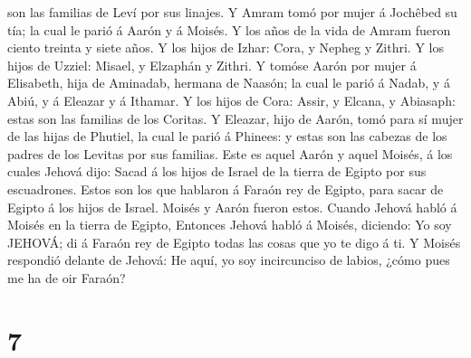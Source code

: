 son las familias de Leví por sus linajes.  Y Amram tomó
por mujer á Jochêbed su tía; la cual le parió á Aarón y á Moisés. Y los
años de la vida de Amram fueron ciento treinta y siete años.
 Y los hijos de Izhar: Cora, y Nepheg y Zithri.
 Y los hijos de Uzziel: Misael, y Elzaphán y Zithri.
 Y tomóse Aarón por mujer á Elisabeth, hija de Aminadab,
hermana de Naasón; la cual le parió á Nadab, y á Abiú, y á Eleazar y á
Ithamar.  Y los hijos de Cora: Assir, y Elcana, y
Abiasaph: estas son las familias de los Coritas.  Y
Eleazar, hijo de Aarón, tomó para sí mujer de las hijas de Phutiel, la
cual le parió á Phinees: y estas son las cabezas de los padres de los
Levitas por sus familias.  Este es aquel Aarón y aquel
Moisés, á los cuales Jehová dijo: Sacad á los hijos de Israel de la
tierra de Egipto por sus escuadrones.  Estos son los que
hablaron á Faraón rey de Egipto, para sacar de Egipto á los hijos de
Israel. Moisés y Aarón fueron estos.  Cuando Jehová habló
á Moisés en la tierra de Egipto,  Entonces Jehová habló á
Moisés, diciendo: Yo soy JEHOVÁ; di á Faraón rey de Egipto todas las
cosas que yo te digo á ti.  Y Moisés respondió delante de
Jehová: He aquí, yo soy incircunciso de labios, ¿cómo pues me ha de oir
Faraón?

\hypertarget{section-6}{%
\section{7}\label{section-6}}

